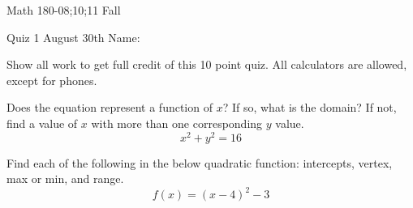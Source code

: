 \documentclass[11pt,epsfig]{article}
\begin{document}
Math 180-08;10;11 Fall

Quiz 1 August 30th \hspace{1.9in} {Name:} {\underline {\hspace{2.5in}}}
\vspace{2pc}

Show all work to get full credit of this 10 point quiz. All calculators are allowed, except for phones.
\vspace{2pc}

\begin{problem}{5}
Does the equation represent a function of $x$? If so, what is the domain? If not, find a value of $x$ with more than one corresponding $y$ value. 
\begin{equation}
x^2 + y^2 = 16
\end{equation}
\vfill
\end{problem}

\begin{problem}{5}
Find each of the following in the below quadratic function: intercepts, vertex, max or min, and range. 
\begin{equation}
f(x) = (x-4)^2 - 3
\end{equation}
\vfill
\end{problem}




\showpoints
\end{document}
